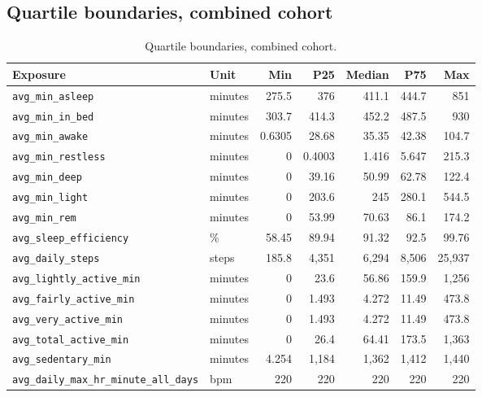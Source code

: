 \documentclass[11pt]{article}
\newcommand{\code}[1]{\texttt{\small #1}}
\begin{document}
\subsection{Quartile boundaries, combined cohort}
\begin{table}[h]\centering\footnotesize\begin{tabular}{@{}llrrrrr@{}}\toprule
\textbf{Exposure} & \textbf{Unit} & \textbf{Min} & \textbf{P25} & \textbf{Median} & \textbf{P75} & \textbf{Max} \\ \midrule
\code{avg\_min\_asleep} & minutes & 275.5 &   376 & 411.1 & 444.7 &   851 \\
\code{avg\_min\_in\_bed} & minutes & 303.7 & 414.3 & 452.2 & 487.5 &   930 \\
\code{avg\_min\_awake} & minutes & 0.6305 & 28.68 & 35.35 & 42.38 & 104.7 \\
\code{avg\_min\_restless} & minutes & 0 & 0.4003 & 1.416 & 5.647 & 215.3 \\
\code{avg\_min\_deep} & minutes & 0 & 39.16 & 50.99 & 62.78 & 122.4 \\
\code{avg\_min\_light} & minutes & 0 & 203.6 &   245 & 280.1 & 544.5 \\
\code{avg\_min\_rem} & minutes & 0 & 53.99 & 70.63 &  86.1 & 174.2 \\
\code{avg\_sleep\_efficiency} & \% & 58.45 & 89.94 & 91.32 &  92.5 & 99.76 \\
\code{avg\_daily\_steps} & steps & 185.8 & 4,351 & 6,294 & 8,506 & 25,937 \\
\code{avg\_lightly\_active\_min} & minutes & 0 &  23.6 & 56.86 & 159.9 & 1,256 \\
\code{avg\_fairly\_active\_min} & minutes & 0 & 1.493 & 4.272 & 11.49 & 473.8 \\
\code{avg\_very\_active\_min} & minutes & 0 & 1.493 & 4.272 & 11.49 & 473.8 \\
\code{avg\_total\_active\_min} & minutes & 0 &  26.4 & 64.41 & 173.5 & 1,363 \\
\code{avg\_sedentary\_min} & minutes & 4.254 & 1,184 & 1,362 & 1,412 & 1,440 \\
\code{avg\_daily\_max\_hr\_minute\_all\_days} & bpm &   220 &   220 &   220 &   220 &   220 \\
\bottomrule\end{tabular}\caption{Quartile boundaries, combined cohort.}\label{tab:appM-cut}\end{table}
\end{document}
